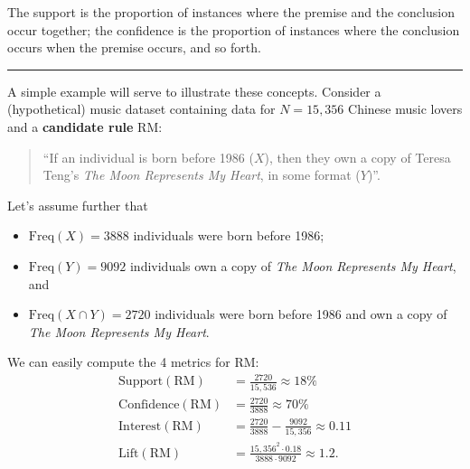 The support is the proportion of instances where the premise and the conclusion occur together; the confidence is the proportion of instances where the conclusion occurs when the premise occurs, and so forth.
\begin{center}
    \rule{0.5\textwidth}{.4pt}
\end{center}
A simple example will serve to illustrate these concepts. Consider a (hypothetical) music dataset containing data for $N=15,356$ Chinese music lovers and a \textbf{candidate rule} RM: \begin{quote}``If an individual is born before 1986 ($X$), then they own a copy of Teresa Teng's \textit{The Moon Represents My Heart}, in some format ($Y$)''. 
\end{quote}
Let's assume further that   
\begin{itemize}[noitemsep]
    \item $\textrm{Freq}(X)=3888$ individuals were born before 1986;
\item $\textrm{Freq}(Y)=9092$ individuals own a copy of \textit{The Moon Represents My Heart}, and 
\item $\textrm{Freq}(X\cap Y)=2720$ individuals were born before 1986 and own a copy of \textit{The Moon Represents My Heart}.
\end{itemize}
We can easily compute the 4 metrics for RM: 
\begin{align*}
    \textrm{Support}(\textrm{RM})&=\frac{2720}{15,536}\approx 18\% \\ 
    \textrm{Confidence}(\textrm{RM})&=\frac{2720}{3888}\approx 70\% \\ 
    \textrm{Interest}(\textrm{RM})&=\frac{2720}{3888}-\frac{9092}{15,356}\approx 0.11 \\ 
\textrm{Lift}(\textrm{RM}) &=\frac{15,356^2\cdot 0.18}{3888\cdot 9092} \approx 1.2.
\end{align*}

